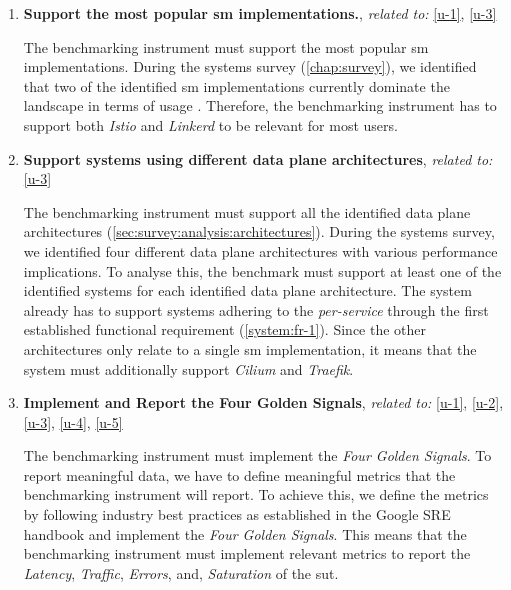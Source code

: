 \begin{enumerate}[label=\textbf{FR\arabic*}, leftmargin=3\parindent]
    \item \textbf{Support the most popular \gls{sm} implementations.}, \textit{related to:} \ref{u-1}, \ref{u-3}
    \label{system:fr-1}
    
    The benchmarking instrument must support the most popular \gls{sm} implementations. During the systems survey (\cref{chap:survey}), we identified that two of the identified \gls{sm} implementations currently dominate the landscape in terms of usage \cite{cncf-survey-2021}. Therefore, the benchmarking instrument has to support both \textit{Istio} and \textit{Linkerd} to be relevant for most users. 
    
    \item \textbf{Support systems using different data plane architectures}, \textit{related to:} \ref{u-3}
    \label{system:fr-2}
    
    The benchmarking instrument must support all the identified data plane architectures (\cref{sec:survey:analysis:architectures}). During the systems survey, we identified four different data plane architectures with various performance implications. To analyse this, the benchmark must support at least one of the identified systems for each identified data plane architecture. The system already has to support systems adhering to the \textit{per-service} through the first established functional requirement (\ref{system:fr-1}). Since the other architectures only relate to a single \gls{sm} implementation, it means that the system must additionally support  \textit{Cilium} and \textit{Traefik}.
    
    \item \textbf{Implement and Report the Four Golden Signals}, \textit{related to:} \ref{u-1}, \ref{u-2}, \ref{u-3}, \ref{u-4}, \ref{u-5} 
    \label{system:fr-3}
    
    The benchmarking instrument must implement the \textit{Four Golden Signals}. To report meaningful data, we have to define meaningful metrics that the benchmarking instrument will report. To achieve this, we define the metrics by following industry best practices as established in the Google SRE handbook \cite{google-sre} and implement the \textit{Four Golden Signals}. This means that the benchmarking instrument must implement relevant metrics to report the \textit{Latency}, \textit{Traffic}, \textit{Errors}, and, \textit{Saturation} of the \gls{sut}.
    

\end{enumerate}
